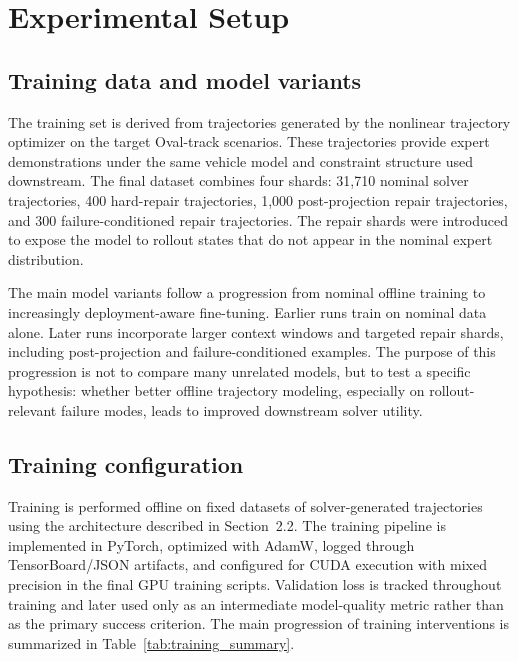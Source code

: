 \section{Experimental Setup}
\label{sec:experimental_setup}

\subsection{Training data and model variants}

The training set is derived from trajectories generated by the nonlinear trajectory optimizer on the target Oval-track scenarios. These trajectories provide expert demonstrations under the same vehicle model and constraint structure used downstream. The final dataset combines four shards: 31,710 nominal solver trajectories, 400 hard-repair trajectories, 1,000 post-projection repair trajectories, and 300 failure-conditioned repair trajectories. The repair shards were introduced to expose the model to rollout states that do not appear in the nominal expert distribution.

The main model variants follow a progression from nominal offline training to increasingly deployment-aware fine-tuning. Earlier runs train on nominal data alone. Later runs incorporate larger context windows and targeted repair shards, including post-projection and failure-conditioned examples. The purpose of this progression is not to compare many unrelated models, but to test a specific hypothesis: whether better offline trajectory modeling, especially on rollout-relevant failure modes, leads to improved downstream solver utility.

\subsection{Training configuration}

Training is performed offline on fixed datasets of solver-generated trajectories using the architecture described in Section~2.2. The training pipeline is implemented in PyTorch, optimized with AdamW, logged through TensorBoard/JSON artifacts, and configured for CUDA execution with mixed precision in the final GPU training scripts. Validation loss is tracked throughout training and later used only as an intermediate model-quality metric rather than as the primary success criterion. The main progression of training interventions is summarized in Table~\ref{tab:training_summary}.

